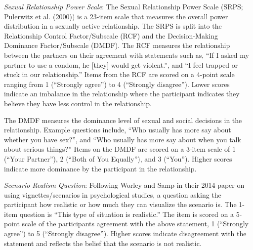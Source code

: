 \documentclass[
  english,
  donotrepeattitle,doc, 12pt, a4paper,floatsintext]{apa7}
\begin{document}
\emph{Sexual Relationship Power Scale}: The Sexual Relationship Power Scale (SRPS; Pulerwitz et al. (2000)) is a 23-item scale that measures the overall power distribution in a sexually active relationship. The SRPS is split into the Relationship Control Factor/Subscale (RCF) and the Decision-Making Dominance Factor/Subscale (DMDF). The RCF measures the relationship between the partners on their agreement with statements such as, ``If I asked my partner to use a condom, he {[}they{]} would get violent.'', and ``I feel trapped or stuck in our relationship.'' Items from the RCF are scored on a 4-point scale ranging from 1 (``Strongly agree'') to 4 (``Strongly disagree''). Lower scores indicate an imbalance in the relationship where the participant indicates they believe they have less control in the relationship.

The DMDF measures the dominance level of sexual and social decisions in the relationship. Example questions include, ``Who usually has more say about whether you have sex?'', and ``Who usually has more say about when you talk about serious things?'' Items on the DMDF are scored on a 3-item scale of 1 (``Your Partner''), 2 (``Both of You Equally''), and 3 (``You''). Higher scores indicate more dominance by the participant in the relationship.

\emph{Scenario Realism Question}: Following Worley and Samp in their 2014 paper on using vignettes/scenarios in psychological studies, a question asking the participant how realistic or how much they can visualize the scenario is. The 1-item question is ``This type of situation is realistic.'' The item is scored on a 5-point scale of the participants agreement with the above statement, 1 (``Strongly agree'') to 5 (``Strongly disagree''). Higher scores indicate disagreement with the statement and reflects the belief that the scenario is not realistic.
\end{document}
